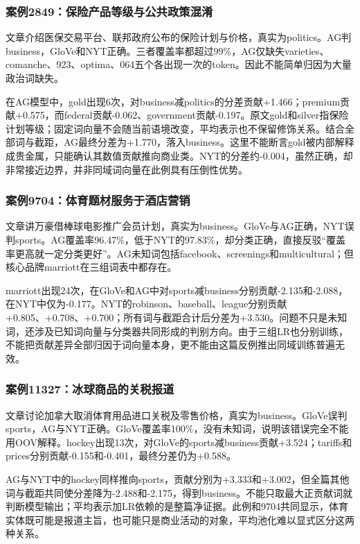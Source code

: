 \documentclass[UTF8,a4paper,11pt,fontset=fandol]{ctexart}
\begin{document}
\subsubsection{案例2849：保险产品等级与公共政策混淆}
文章介绍医保交易平台、联邦政府公布的保险计划与价格，真实为politics。AG判business，GloVe和NYT正确。三者覆盖率都超过99\%，AG仅缺失varieties、comanche、923、optima、064五个各出现一次的token。因此不能简单归因为大量政治词缺失。

在AG模型中，gold出现6次，对business减politics的分差贡献+1.466；premium贡献+0.575，而federal贡献-0.062、government贡献-0.197。原文gold和silver指保险计划等级；固定词向量不会随当前语境改变，平均表示也不保留修饰关系。结合全部词与截距，AG最终分差为+1.770，落入business。这里不能断言gold被内部解释成贵金属，只能确认其数值贡献推向商业类。NYT的分差约-0.004，虽然正确，却非常接近边界，并非同域词向量在此例具有压倒性优势。

\subsubsection{案例9704：体育题材服务于酒店营销}
文章讲万豪借棒球电影推广会员计划，真实为business。GloVe与AG正确，NYT误判sports。AG覆盖率96.47\%，低于NYT的97.83\%，却分类正确，直接反驳“覆盖率更高就一定分类更好”。AG未知词包括facebook、screenings和multicultural；但核心品牌marriott在三组词表中都存在。

marriott出现24次，在GloVe和AG中对sports减business分别贡献-2.135和-2.088，在NYT中仅为-0.177。NYT的robinson、baseball、league分别贡献+0.805、+0.708、+0.700；所有词与截距合计后分差为+3.530。问题不只是未知词，还涉及已知词向量与分类器共同形成的判别方向。由于三组LR也分别训练，不能把贡献差异全部归因于词向量本身，更不能由这篇反例推出同域训练普遍无效。

\subsubsection{案例11327：冰球商品的关税报道}
文章讨论加拿大取消体育用品进口关税及零售价格，真实为business。GloVe误判sports，AG与NYT正确。GloVe覆盖率100\%，没有未知词，说明该错误完全不能用OOV解释。hockey出现13次，对GloVe的sports减business贡献+3.524；tariffs和prices分别贡献-0.155和-0.401，最终分差仍为+0.588。

AG与NYT中的hockey同样推向sports，贡献分别为+3.333和+3.002，但全篇其他词与截距共同使分差降为-2.488和-2.175，得到business。不能只取最大正贡献词就判断模型输出；平均表示加LR依赖的是整篇净证据。此例和9704共同显示，体育实体既可能是报道主旨，也可能只是商业活动的对象，平均池化难以显式区分这两种关系。
\end{document}
